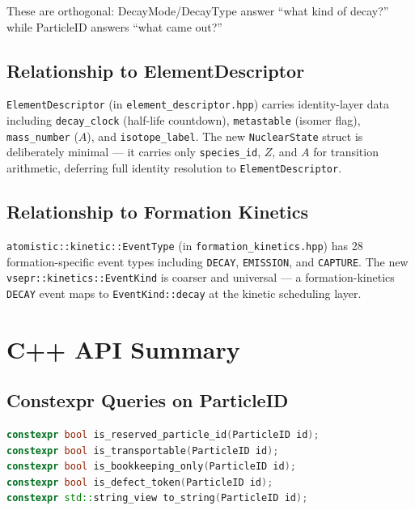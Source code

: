 \documentclass[11pt,a4paper]{article}
\begin{document}
These are orthogonal: DecayMode/DecayType answer ``what kind of decay?'' while ParticleID answers ``what came out?''

\subsection{Relationship to ElementDescriptor}

\texttt{ElementDescriptor} (in \texttt{element\_descriptor.hpp}) carries identity-layer data including \texttt{decay\_clock} (half-life countdown), \texttt{metastable} (isomer flag), \texttt{mass\_number} ($A$), and \texttt{isotope\_label}. The new \texttt{NuclearState} struct is deliberately minimal --- it carries only \texttt{species\_id}, $Z$, and $A$ for transition arithmetic, deferring full identity resolution to \texttt{ElementDescriptor}.

\subsection{Relationship to Formation Kinetics}

\texttt{atomistic::kinetic::EventType} (in \texttt{formation\_kinetics.hpp}) has 28 formation-specific event types including \texttt{DECAY}, \texttt{EMISSION}, and \texttt{CAPTURE}. The new \texttt{vsepr::kinetics::EventKind} is coarser and universal --- a formation-kinetics \texttt{DECAY} event maps to \texttt{EventKind::decay} at the kinetic scheduling layer.

\section{C++ API Summary}
\label{sec:cpp-api}

\subsection{Constexpr Queries on ParticleID}

\begin{lstlisting}[language=C++]
constexpr bool is_reserved_particle_id(ParticleID id);
constexpr bool is_transportable(ParticleID id);
constexpr bool is_bookkeeping_only(ParticleID id);
constexpr bool is_defect_token(ParticleID id);
constexpr std::string_view to_string(ParticleID id);
\end{lstlisting}
\end{document}
